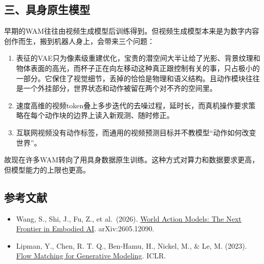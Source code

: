 \hypertarget{ux4e09ux5177ux8eabux539fux751fux6a21ux578b}{%
\subsection{三、具身原生模型}\label{ux4e09ux5177ux8eabux539fux751fux6a21ux578b}}

早期的WAM往往由视频生成模型后训练得到。但视频生成模型本来是为数字内容创作而生，搬到机器人身上，会带来三个问题：

\begin{enumerate}
\def\labelenumi{\arabic{enumi}.}
\item
  表征的VAE只为像素级重建优化，宝贵的潜空间大半让给了光影、背景纹理和物体表面的高光，而杯子正在向左移动这种真正跟控制有关的事，只占极小的一部分。它保住了视觉细节，丢掉的恰恰是物理和语义结构。且动作模块往往是一个外挂部分，世界状态和动作被留在两个对不齐的空间里。
\item
  速度高维的视频token叠上多步迭代的去噪过程，延时长，而真机操作要求策略在每个动作块的边界上读入新观测、随时修正。
\item
  互联网视频没有动作标签，而通用的视频预测目标并不教模型``动作如何改变世界''。
\end{enumerate}

故现在许多WAM转向了用具身数据原生训练。这种方式对算力和数据要求更高，但模型能力的上限也更高。

\FloatBarrier
{}
\hypertarget{ux53c2ux8003ux6587ux732e-158}{%
\subsection{参考文献}\label{ux53c2ux8003ux6587ux732e-158}}

\vspace{0.25em}
\begin{itemize}
\tightlist
\item
  Wang, S., Shi, J., Fu, Z., et al.~(2026). \href{https://arxiv.org/abs/2605.12090}{World Action Models: The Next Frontier in Embodied AI}. arXiv:2605.12090.
\item
  Lipman, Y., Chen, R. T. Q., Ben-Hamu, H., Nickel, M., \& Le, M. (2023). \href{https://arxiv.org/abs/2210.02747}{Flow Matching for Generative Modeling}. ICLR.
\end{itemize}

\clearpage
